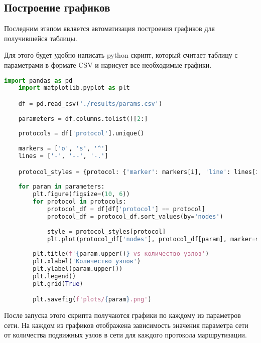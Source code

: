 \subsection*{Построение графиков}

Последним этапом является автоматизация построения графиков для получившейся таблицы.

Для этого будет удобно написать python скрипт, который считает таблицу с параметрами в формате CSV и нарисует все необходимые графики.

\begin{lstlisting}[language=python, style=mystyle, caption=Python скрипт для построения графиков]
    import pandas as pd
    import matplotlib.pyplot as plt

    df = pd.read_csv('./results/params.csv')
    
    parameters = df.columns.tolist()[2:]
    
    protocols = df['protocol'].unique()
    
    markers = ['o', 's', '^']
    lines = ['-', '--', '-.']

    protocol_styles = {protocol: {'marker': markers[i], 'line': lines[i]} for i, protocol in enumerate(protocols)}
    
    for param in parameters:
        plt.figure(figsize=(10, 6))
        for protocol in protocols:
            protocol_df = df[df['protocol'] == protocol]
            protocol_df = protocol_df.sort_values(by='nodes')
    
            style = protocol_styles[protocol]
            plt.plot(protocol_df['nodes'], protocol_df[param], marker=style['marker'], linestyle=style['line'], label=protocol)
    
        plt.title(f'{param.upper()} vs количество узлов')
        plt.xlabel('Количество узлов')
        plt.ylabel(param.upper())
        plt.legend()
        plt.grid(True)

        plt.savefig(f'plots/{param}.png') 
\end{lstlisting}

После запуска этого скрипта получаются графики по каждому из параметров сети. На каждом из графиков отображена зависимость значения параметра сети от количества подвижных узлов в сети для каждого протокола маршрутизации.~\cite{sarao2018comparison}